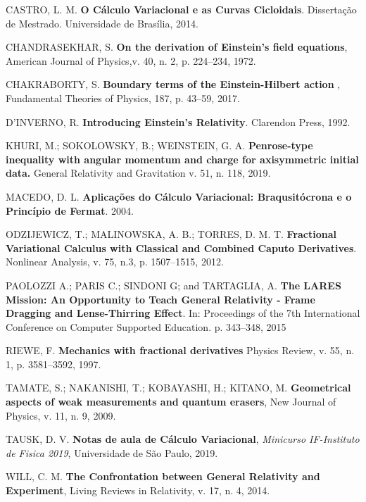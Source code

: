 \documentclass[a4,11pt]{report}
\begin{document}
\begin{thebibliography}{99} 

CASTRO, L. M. {\bf O Cálculo Variacional e as Curvas Cicloidais}. Dissertação de Mestrado. Universidade de Brasília, 2014.

CHANDRASEKHAR, S. {\bf On the derivation of Einstein’s field
equations}, American Journal of Physics,v. 40, n. 2, p. 224–234, 1972.

CHAKRABORTY, S. {\bf Boundary terms of the Einstein-Hilbert action
}, Fundamental Theories of Physics, 187, p. 43–59, 2017.

D'INVERNO, R. {\bf Introducing Einstein's Relativity}. Clarendon Press, 1992.

KHURI, M.; SOKOLOWSKY, B.; WEINSTEIN, G. A. {\bf Penrose-type inequality with angular momentum and charge for axisymmetric initial data.} General Relativity and Gravitation v. 51, n. 118, 2019.

MACEDO, D. L. {\bf Aplicações do Cálculo Variacional: Braqusitócrona e o Princípio
de Fermat}. 2004.

ODZIJEWICZ, T.; MALINOWSKA, A. B.; TORRES, D. M. T. {\bf Fractional Variational Calculus with Classical and Combined Caputo Derivatives}. Nonlinear Analysis, v. 75, n.3, p. 1507--1515, 2012.

PAOLOZZI A.; PARIS C.; SINDONI G; and TARTAGLIA, A. {\bf The LARES Mission: An Opportunity to Teach General Relativity - Frame Dragging and Lense-Thirring Effect}. In: Proceedings of the 7th International Conference on Computer Supported Education. p. 343--348, 2015

RIEWE, F. {\bf Mechanics with fractional derivatives} Physics Review, v. 55, n. 1, p. 3581--3592, 1997.


TAMATE, S.; NAKANISHI, T.; KOBAYASHI, H.; KITANO, M. {\bf Geometrical aspects of weak measurements and quantum erasers}, New Journal of Physics, v. 11, n. 9, 2009.


TAUSK, D. V. {\bf Notas de aula de Cálculo Variacional}, {\it Minicurso IF-Instituto de Fisica 2019}, Universidade de São Paulo, 2019.

WILL, C. M. {\bf The Confrontation between General Relativity and Experiment}, Living Reviews in Relativity, v. 17, n. 4, 2014.
\end{thebibliography}
\end{document}
